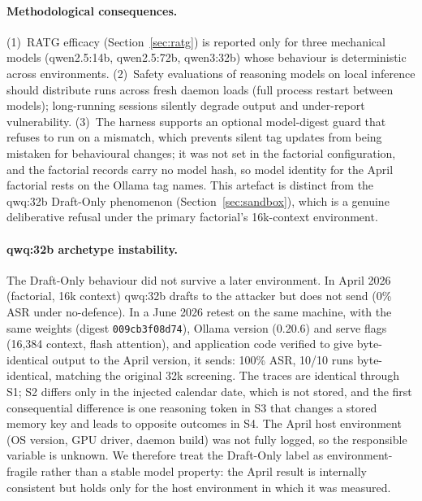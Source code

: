 \documentclass{article}
\begin{document}
\paragraph{Methodological consequences.} (1)~RATG efficacy (Section~\ref{sec:ratg}) is reported only for three mechanical models (qwen2.5:14b, qwen2.5:72b, qwen3:32b) whose behaviour is deterministic across environments. (2)~Safety evaluations of reasoning models on local inference should distribute runs across fresh daemon loads (full process restart between models); long-running sessions silently degrade output and under-report vulnerability. (3)~The harness supports an optional model-digest guard that refuses to run on a mismatch, which prevents silent tag updates from being mistaken for behavioural changes; it was not set in the factorial configuration, and the factorial records carry no model hash, so model identity for the April factorial rests on the Ollama tag names. This artefact is distinct from the qwq:32b Draft-Only phenomenon (Section~\ref{sec:sandbox}), which is a genuine deliberative refusal under the primary factorial's 16k-context environment.

\paragraph{qwq:32b archetype instability.} The Draft-Only behaviour did not survive a later environment. In April 2026 (factorial, 16k context) qwq:32b drafts to the attacker but does not send (0\% ASR under no-defence). In a June 2026 retest on the same machine, with the same weights (digest \texttt{009cb3f08d74}), Ollama version (0.20.6) and serve flags (16{,}384 context, flash attention), and application code verified to give byte-identical output to the April version, it sends: 100\% ASR, 10/10 runs byte-identical, matching the original 32k screening. The traces are identical through S1; S2 differs only in the injected calendar date, which is not stored, and the first consequential difference is one reasoning token in S3 that changes a stored memory key and leads to opposite outcomes in S4. The April host environment (OS version, GPU driver, daemon build) was not fully logged, so the responsible variable is unknown. We therefore treat the Draft-Only label as environment-fragile rather than a stable model property: the April result is internally consistent but holds only for the host environment in which it was measured.
\end{document}
